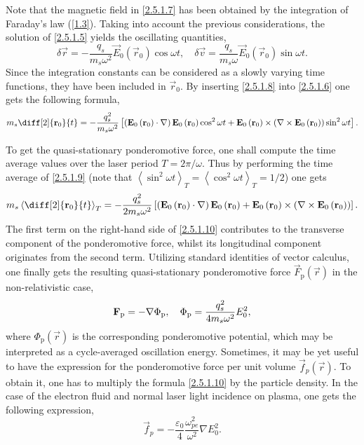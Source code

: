 Note that the magnetic field in \ref{2.5.1.7} has been obtained by the integration of Faraday's law (\ref{1.3}). Taking into account the previous considerations, the solution of \ref{2.5.1.5} yields the oscillating quantities,
\begin{equation}
\label{2.5.1.8}
\delta \vec{r} = -\frac{q_s}{m_s \omega^2} \vec{E}_0 \left(\vec{r}_0 \right) \cos \omega t, \quad \delta \vec{v} = \frac{q_s}{m_s \omega} \vec{E}_0 \left(\vec{r}_0 \right) \sin \omega t.
\end{equation}
Since the integration constants can be considered as a slowly varying time functions, they have been included in $ \vec{r}_0 $. By inserting \ref{2.5.1.8} into \ref{2.5.1.6} one gets the following formula,
\begin{equation}
\label{2.5.1.9}
m_s \diff[2]{\vec{r}_0}{t} = - \frac{q_s^{2}}{m_s \omega^2} \left[\left(\vec{E}_0 \left(\vec{r}_0 \right) \cdot \nabla \right) \vec{E}_0 \left(\vec{r}_0 \right) \cos^2 \omega t + \vec{E}_0 \left(\vec{r}_0 \right) \times \left( \nabla \times \vec{E}_0 \left(\vec{r}_0 \right) \right) \sin^2 \omega t \right].
\end{equation}

To get the quasi-stationary ponderomotive force, one shall compute the time average values over the laser period $ T = 2 \pi/ \omega $. Thus by performing the time average of \ref{2.5.1.9} (note that $ \left\langle \sin^2 \omega t \right\rangle_T = \left\langle \cos^2 \omega t \right\rangle_T = 1/2$) one gets
\begin{equation}
\label{2.5.1.10}
m_s \left\langle \diff[2]{\vec{r}_0}{t} \right\rangle_{T} = - \frac{q_s^{2}}{2 m_s \omega^2} \left[\left(\vec{E}_0 \left(\vec{r}_0 \right) \cdot \nabla \right) \vec{E}_0 \left(\vec{r}_0 \right) + \vec{E}_0 \left(\vec{r}_0 \right) \times \left( \nabla \times \vec{E}_0 \left(\vec{r}_0 \right) \right)\right].
\end{equation}
The first term on the right-hand side of \ref{2.5.1.10} contributes to the transverse component of the ponderomotive force, whilst its longitudinal component originates from the second term. Utilizing standard identities of vector calculus, one finally gets the resulting quasi-stationary ponderomotive force $ \vec{F}_{\mathrm{p}} \left( \vec{r} \right) $ in the non-relativistic case,
\begin{equation}
\label{2.5.1.11}
\mathbf{F}_{\mathrm{p}} = - \nabla \Phi_{\mathrm{p}}, \quad \Phi_{\mathrm{p}} = \frac{q_s^{2}}{4 m_s \omega^2} E_0^{2},
\end{equation}
where $ \Phi_{\mathrm{p}} \left( \vec{r} \right) $ is the corresponding ponderomotive potential, which may be interpreted as a cycle-averaged oscillation energy. Sometimes, it may be yet useful to have the expression for the ponderomotive force per unit volume $ \vec{f}_{p} \left( \vec{r} \right) $. To obtain it, one has to multiply the formula \ref{2.5.1.10} by the particle density. In the case of the electron fluid and normal laser light incidence on plasma, one gets the following expression,
\begin{equation}
\vec{f}_{p} = - \frac{\varepsilon_0}{4} \frac{\omega_{pe}^{2}}{\omega^{2}} \nabla E_0^{2}.
\end{equation}
